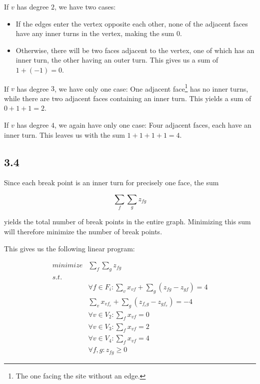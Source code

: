 \documentclass[11pt,a4paper]{article}
\begin{document}
If $v$ has degree $2$, we have two cases:

\begin{itemize}
    \item If the edges enter the vertex opposite each other, none of the
          adjacent faces have any inner turns in the vertex, making the sum $0$.
    \item Otherwise, there will be two faces adjacent to the vertex, one of
          which has an inner turn, the other having an outer turn. This gives us a
          sum of $1 + (-1) = 0$.
\end{itemize}

If $v$ has degree $3$, we have only one case: One adjacent face\footnote{The
one facing the site without an edge.} has no inner turns, while there are two
adjacent faces containing an inner turn. This yields a sum of $0+1+1 = 2$.

If $v$ has degree $4$, we again have only one case: Four adjacent faces, each
have an inner turn. This leaves us with the sum $1+1+1+1=4$.

\subsection{3.4}
Since each break point is an inner turn for precisely one face, the sum

\[
    \sum_f \sum_g z_{fg}
\]

yields the total number of break points in the entire graph. Minimizing this
sum will therefore minimize the number of break points.

This gives us the following linear program:

\begin{align*}
    minimize & \sum_f \sum_g z_{fg} \\
    s.t.     & \\
             & \forall f \in F_i: \sum_v x_{vf} + \sum_g (z_{fg} - z_{gf}) = 4 \\
             & \sum_v x_{vf_e} + \sum_g (z_{f_eg} - z_{gf_e}) = -4 \\
             & \forall v \in V_2: \sum_f x_{vf} = 0 \\
             & \forall v \in V_3: \sum_f x_{vf} = 2 \\
             & \forall v \in V_4: \sum_f x_{vf} = 4 \\
             & \forall f, g: z_{fg} \geq 0 
\end{align*}
\end{document}
